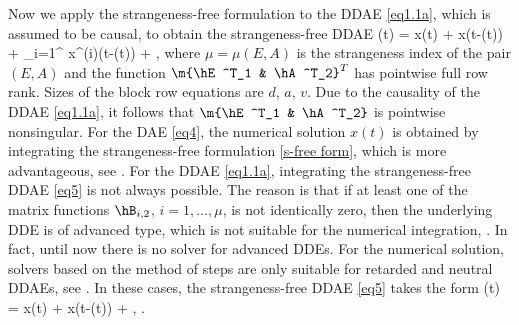 \documentclass[final,reqno]{siamltex}
\begin{document}
Now we apply the strangeness-free formulation to the DDAE \eqref{eq1.1a}, which is assumed to be causal, to obtain the strangeness-free DDAE
%
\be\label{eq5}
  (t) \!=\!  x(t) \!+\!
  x(t-\vtau(t))
 \!+\!  \sum_{i=1}^{\mu}  x^{(i)}(t-\vtau(t))
 \!+\! , \quad {}
\ee
%
where $\mu=\mu(E,A)$ is the strangeness index of the pair $(E,A)$ and the function $\m{\hE^T_1 & \hA^T_2}^T$ has pointwise full row rank.
Sizes of the block row equations are $d$, $a$, $v$. Due to the causality of the DDAE \eqref{eq1.1a}, it follows that $\m{\hE^T_1 & \hA^T_2}$ is pointwise 
nonsingular.
For the DAE \eqref{eq4}, the numerical solution $x(t)$ is obtained by integrating the strangeness-free formulation \eqref{s-free form}, which is more 
advantageous, see \cite{KunM96a,KunM96c,KunM06}.
For the DDAE \eqref{eq1.1a}, integrating the strangeness-free DDAE \eqref{eq5} is not always possible. The reason is that if 
at least one of the matrix functions $\hB_{i,2}$, $i=1,\dots,\mu$, is not identically zero, then the underlying DDE 
is of advanced type, which is not suitable for the numerical integration, \cite{BelZ03}. In fact, until now there is no solver for advanced DDEs. 
For the numerical solution, solvers based on the method of steps are only suitable for retarded and neutral DDAEs, see \cite{AscP95,GugH07,Hau97,HaM14}.
In these cases, the strangeness-free DDAE \eqref{eq5} takes the form
%
\be\label{eq6}
  (t) \!=\!  x(t) \!+\!
  x(t-\vtau(t)) \!+\! , \quad {}.
\end{document}
